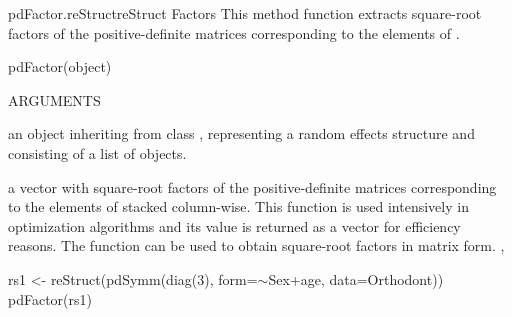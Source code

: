 \documentclass[pdftex]{article} \usepackage{url,graphicx}
\renewcommand{\Twiddle}{\mbox{\(\sim\)}}
\begin{document}
\begin{Helpfile}{pdFactor.reStruct}{reStruct Factors}
This method function extracts square-root factors of the
positive-definite matrices corresponding to the  elements
of .
\begin{Example}
pdFactor(object)
\end{Example}
\begin{Argument}{ARGUMENTS}
\item[\Co{object:}]
an object inheriting from class ,
representing a random effects structure and consisting of a list of
 objects.
\end{Argument}
a vector with square-root factors of the positive-definite matrices
corresponding to the elements of  stacked column-wise.
 This function is used intensively in optimization
algorithms and its value is returned as a vector for efficiency
reasons. The  function can be used to obtain
square-root factors in matrix form.
, 
\need 15pt
\vspace{-16pt} 
\begin{Example}
rs1 <- reStruct(pdSymm(diag(3), form=\Twiddle Sex+age, data=Orthodont))
pdFactor(rs1)
\end{Example}
\end{Helpfile}
\end{document}
